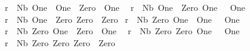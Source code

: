 \begin{isabellebody}
{\isachardoublequoteopen}r{}{}{}\ \ {\isacharparenleft}Nb\ One\ \ One\ \ Zero{\isacharparenright}\ {\isacharequal}\ One{\isachardoublequoteclose}\ \ {\isacharbar}\isanewline
{\isachardoublequoteopen}r{}{}{}\ \ {\isacharparenleft}Nb\ One\ \ Zero\ One{\isacharparenright}\ \ {\isacharequal}\ One{\isachardoublequoteclose}\ \ {\isacharbar}\isanewline
{\isachardoublequoteopen}r{}{}{}\ \ {\isacharparenleft}Nb\ One\ \ Zero\ Zero{\isacharparenright}\ {\isacharequal}\ Zero{\isachardoublequoteclose}\ {\isacharbar}\isanewline
{\isachardoublequoteopen}r{}{}{}\ \ {\isacharparenleft}Nb\ Zero\ One\ \ One{\isacharparenright}\ \ {\isacharequal}\ One{\isachardoublequoteclose}\ \ {\isacharbar}\isanewline
{\isachardoublequoteopen}r{}{}{}\ \ {\isacharparenleft}Nb\ Zero\ One\ \ Zero{\isacharparenright}\ {\isacharequal}\ One{\isachardoublequoteclose}\ \ {\isacharbar}\isanewline
{\isachardoublequoteopen}r{}{}{}\ \ {\isacharparenleft}Nb\ Zero\ Zero\ One{\isacharparenright}\ \ {\isacharequal}\ One{\isachardoublequoteclose}\ \ {\isacharbar}\isanewline
{\isachardoublequoteopen}r{}{}{}\ \ {\isacharparenleft}Nb\ Zero\ Zero\ Zero{\isacharparenright}\ {\isacharequal}\ Zero{\isachardoublequoteclose}\isanewline
%
\isadelimtheory
\isanewline
%
\endisadelimtheory
%
\isatagtheory
{}\isamarkupfalse%
%
\endisatagtheory
{\isafoldtheory}%
%
\isadelimtheory
%
\endisadelimtheory
%
\end{isabellebody}%
\endinput
